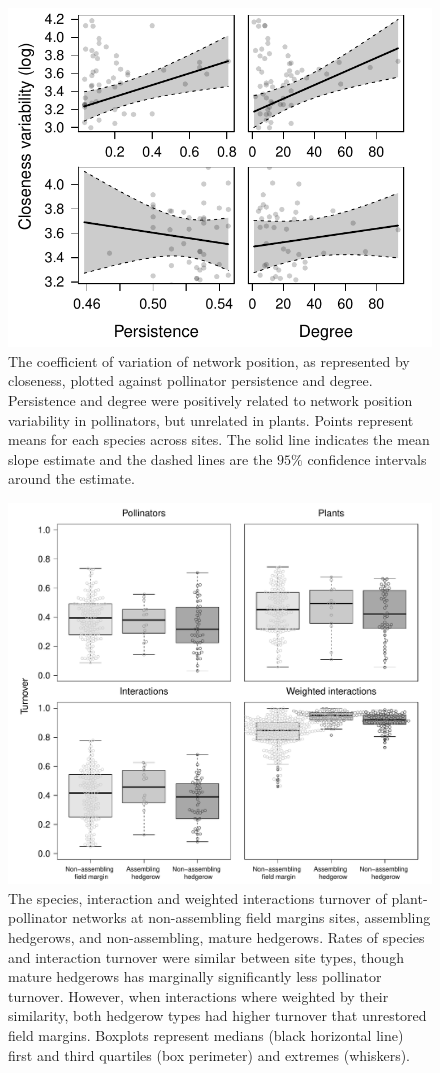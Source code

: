 \documentclass[12pt]{article}
\begin{document}
\begin{figure}
  \centering
  \includegraphics[width=.8\textwidth]{../analysis/variability/figures/cv/occ_degree.pdf}
  \caption{The coefficient of variation of network position, as
    represented by closeness, plotted against pollinator persistence
    and degree. Persistence and degree were positively related to
    network position variability in pollinators, but unrelated in
    plants. Points represent means for each species across sites. The
    solid line indicates the mean slope estimate and the dashed lines
    are the $95\%$ confidence intervals around the estimate. }
  \label{fig:cv}
\end{figure}
\clearpage


\begin{figure}
  \centering
  \includegraphics[width=.7\textwidth]{../analysis/variability/figures/turnover_panels.pdf}
  \caption{The species, interaction and weighted interactions turnover
    of plant-pollinator networks at non-assembling field margins
    sites, assembling hedgerows, and non-assembling, mature
    hedgerows. Rates of species and interaction turnover were similar
    between site types, though mature hedgerows has marginally
    significantly less pollinator turnover.  However, when
    interactions where weighted by their similarity, both hedgerow
    types had higher turnover that unrestored field margins. Boxplots
    represent medians (black horizontal line) first and third
    quartiles (box perimeter) and extremes (whiskers). }
  \label{fig:beta}
\end{figure}
\clearpage
\end{document}
